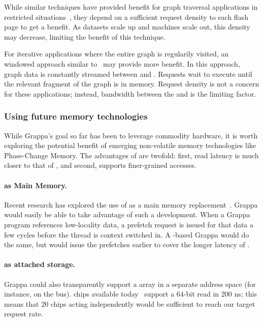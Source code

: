 While similar techniques have provided benefit for graph traversal applications in
restricted situations~\cite{magt:2010}, they depend on a sufficient request
density to each flash page to get a benefit. As datasets scale up and machines scale out, this
density may decrease, limiting the benefit of this technique.

For iterative applications where the entire graph is regularily
visited, an windowed approach similar to~\cite{graphchi:osdi12} may
provide more benefit. In this approach, graph data is constantly
streamed between  and . Requests wait to execute until the
relevant fragment of the graph is in memory. Request density is not a
concern for these applications; instead, bandwidth between the  and 
is the limiting factor.

\subsubsection{Using future memory technologies}

While Grappa's goal so far has been to leverage commodity hardware, it
is worth exploring the potential benefit of emerging non-volatile
memory technologies like Phase-Change Memory. The advantages of 
are twofold: first, read latency is much closer to that of , and
second,  supports finer-grained accesses.

\paragraph{ as Main Memory.}
Recent research has explored the use of  as a main memory
replacement~\cite{pcm:isca09}. Grappa would easily be able to take advantage of such a
development. When a Grappa program references low-locality data,
a prefetch request is issued for that data a few cycles before the
thread is context switched in. A -based
Grappa would do the same, but would issue the prefetches earlier to
cover the longer latency of .

\paragraph{ as attached storage.}
Grappa could also transparently support a  array in a separate address space (for
instance, on the  bus).  chips available today~\cite{micronPCM} support a
64-bit read in 200 ns; this means that 20 chips acting independently
would be sufficient to reach our target request rate.

